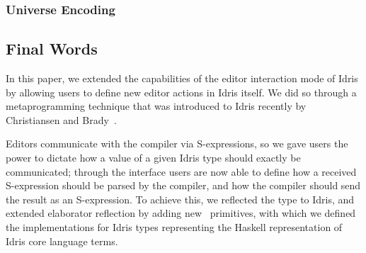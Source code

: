 


\subsubsection{Universe Encoding}
\label{sssec:universeEncoding}


\subsection{Final Words}

In this paper, we extended the capabilities of the editor interaction mode of
Idris by allowing users to define new editor actions in Idris itself. We did
so through a metaprogramming technique that was introduced to Idris recently by
Christiansen and Brady~\cite{elabref}.

Editors communicate with the compiler via S-expressions, so we gave users the
power to dictate how a value of a given Idris type should exactly be
communicated; through the  interface users are now able to
define how a received S-expression should be parsed by the compiler, and how
the compiler should send the result as an S-expression. To achieve this, we
reflected the  type to Idris, and extended elaborator reflection
by adding new \Elab\ primitives, with which we defined the 
implementations for Idris types representing the Haskell representation of
Idris core language terms.

